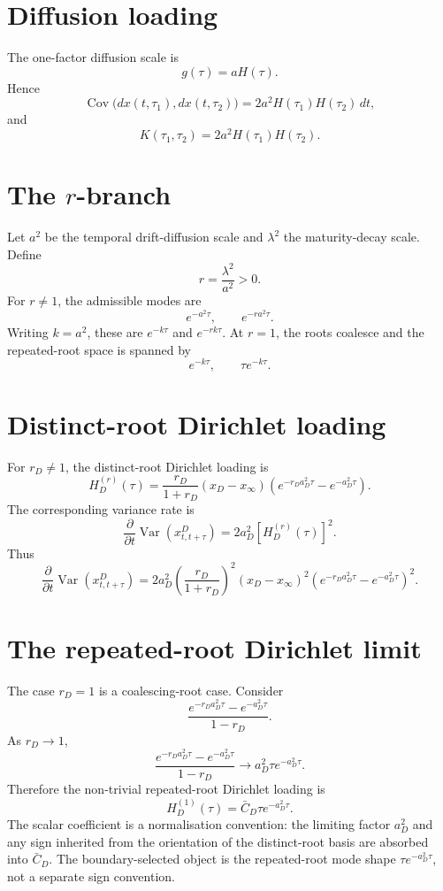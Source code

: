 \documentclass[11pt,oneside]{book}
\begin{document}
\section{Diffusion loading}
The one-factor diffusion scale is
\[
g(\tau)=aH(\tau).
\]
Hence
\[
\operatorname{Cov}\bigl(dx(t,\tau_1),dx(t,\tau_2)\bigr)
=
2a^2H(\tau_1)H(\tau_2)\,dt,
\]
and
\[
K(\tau_1,\tau_2)=2a^2H(\tau_1)H(\tau_2).
\]

\section{The \texorpdfstring{\(r\)}{r}-branch}
Let \(a^2\) be the temporal drift-diffusion scale and \(\lambda^2\) the maturity-decay scale. Define
\[
r=\frac{\lambda^2}{a^2}>0.
\]
For \(r\neq1\), the admissible modes are
\[
e^{-a^2\tau},
\qquad
 e^{-ra^2\tau}.
\]
Writing \(k=a^2\), these are \(e^{-k\tau}\) and \(e^{-rk\tau}\). At \(r=1\), the roots coalesce and the repeated-root space is spanned by
\[
e^{-k\tau},
\qquad
\tau e^{-k\tau}.
\]

\section{Distinct-root Dirichlet loading}
For \(r_D\neq1\), the distinct-root Dirichlet loading is
\[
H_D^{(r)}(\tau)
=
\frac{r_D}{1+r_D}(x_D-x_\infty)
\left(e^{-r_Da_D^2\tau}-e^{-a_D^2\tau}\right).
\]
The corresponding variance rate is
\[
\frac{\partial}{\partial t}\operatorname{Var}(x^D_{t,t+\tau})
=
2a_D^2\left[H_D^{(r)}(\tau)\right]^2.
\]
Thus
\[
\frac{\partial}{\partial t}\operatorname{Var}(x^D_{t,t+\tau})
=
2a_D^2\left(\frac{r_D}{1+r_D}\right)^2(x_D-x_\infty)^2
\left(e^{-r_Da_D^2\tau}-e^{-a_D^2\tau}\right)^2.
\]

\section{The repeated-root Dirichlet limit}
The case \(r_D=1\) is a coalescing-root case. Consider
\[
\frac{e^{-r_Da_D^2\tau}-e^{-a_D^2\tau}}{1-r_D}.
\]
As \(r_D\to1\),
\[
\frac{e^{-r_Da_D^2\tau}-e^{-a_D^2\tau}}{1-r_D}
\longrightarrow
 a_D^2\tau e^{-a_D^2\tau}.
\]
Therefore the non-trivial repeated-root Dirichlet loading is
\[
H_D^{(1)}(\tau)=\bar C_D\tau e^{-a_D^2\tau}.
\]
The scalar coefficient is a normalisation convention: the limiting factor \(a_D^2\) and any sign inherited from the orientation of the distinct-root basis are absorbed into \(\bar C_D\). The boundary-selected object is the repeated-root mode shape \(\tau e^{-a_D^2\tau}\), not a separate sign convention.
\end{document}
